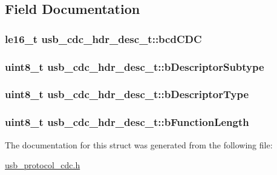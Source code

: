 \subsection{\-Field \-Documentation}
\hypertarget{structusb__cdc__hdr__desc__t_a6882eb0096f4d386031baab86bec8774}{
\subsubsection[{bcd\-C\-D\-C}]{\setlength{\rightskip}{0pt plus 5cm}le16\-\_\-t {\bf usb\-\_\-cdc\-\_\-hdr\-\_\-desc\-\_\-t\-::bcd\-C\-D\-C}}}
\label{structusb__cdc__hdr__desc__t_a6882eb0096f4d386031baab86bec8774}
\hypertarget{structusb__cdc__hdr__desc__t_af15117c083f8811053fc398afc26b1bf}{
\subsubsection[{b\-Descriptor\-Subtype}]{\setlength{\rightskip}{0pt plus 5cm}uint8\-\_\-t {\bf usb\-\_\-cdc\-\_\-hdr\-\_\-desc\-\_\-t\-::b\-Descriptor\-Subtype}}}
\label{structusb__cdc__hdr__desc__t_af15117c083f8811053fc398afc26b1bf}
\hypertarget{structusb__cdc__hdr__desc__t_a2f64e8912373f4772be9cc268aff4336}{
\subsubsection[{b\-Descriptor\-Type}]{\setlength{\rightskip}{0pt plus 5cm}uint8\-\_\-t {\bf usb\-\_\-cdc\-\_\-hdr\-\_\-desc\-\_\-t\-::b\-Descriptor\-Type}}}
\label{structusb__cdc__hdr__desc__t_a2f64e8912373f4772be9cc268aff4336}
\hypertarget{structusb__cdc__hdr__desc__t_a5cc7fd9ccd567771191345f2325f69f5}{
\subsubsection[{b\-Function\-Length}]{\setlength{\rightskip}{0pt plus 5cm}uint8\-\_\-t {\bf usb\-\_\-cdc\-\_\-hdr\-\_\-desc\-\_\-t\-::b\-Function\-Length}}}
\label{structusb__cdc__hdr__desc__t_a5cc7fd9ccd567771191345f2325f69f5}


\-The documentation for this struct was generated from the following file\-:\begin{DoxyCompactItemize}
\item 
\hyperlink{usb__protocol__cdc_8h}{usb\-\_\-protocol\-\_\-cdc.\-h}\end{DoxyCompactItemize}
